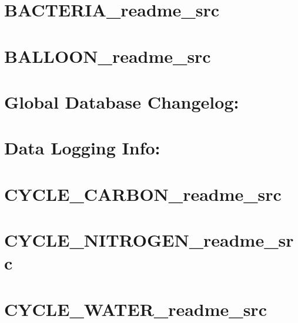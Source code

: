 \let\mypdfximage\pdfximage\def\pdfximage{\immediate\mypdfximage}\documentclass[twoside]{book}
\newcommand{\+}{\discretionary{\mbox{\scriptsize$\hookleftarrow$}}{}{}}
\begin{document}
\chapter{B\+A\+C\+T\+E\+R\+I\+A\+\_\+readme\+\_\+src}
\label{md_doc_readme_src__b_a_c_t_e_r_i_a_readme_src}

\chapter{B\+A\+L\+L\+O\+O\+N\+\_\+readme\+\_\+src}
\label{md_doc_readme_src__b_a_l_l_o_o_n_readme_src}

\chapter{Global Database Changelog\+:}
\label{md_doc_readme_src_changelog_src}

\chapter{Data Logging Info\+:}
\label{md_doc_readme_src__c_r_y_s_t_a_l_readme_src}

\chapter{C\+Y\+C\+L\+E\+\_\+\+C\+A\+R\+B\+O\+N\+\_\+readme\+\_\+src}
\label{md_doc_readme_src__c_y_c_l_e__c_a_r_b_o_n_readme_src}

\chapter{C\+Y\+C\+L\+E\+\_\+\+N\+I\+T\+R\+O\+G\+E\+N\+\_\+readme\+\_\+src}
\label{md_doc_readme_src__c_y_c_l_e__n_i_t_r_o_g_e_n_readme_src}

\chapter{C\+Y\+C\+L\+E\+\_\+\+W\+A\+T\+E\+R\+\_\+readme\+\_\+src}
\label{md_doc_readme_src__c_y_c_l_e__w_a_t_e_r_readme_src}

\end{document}
